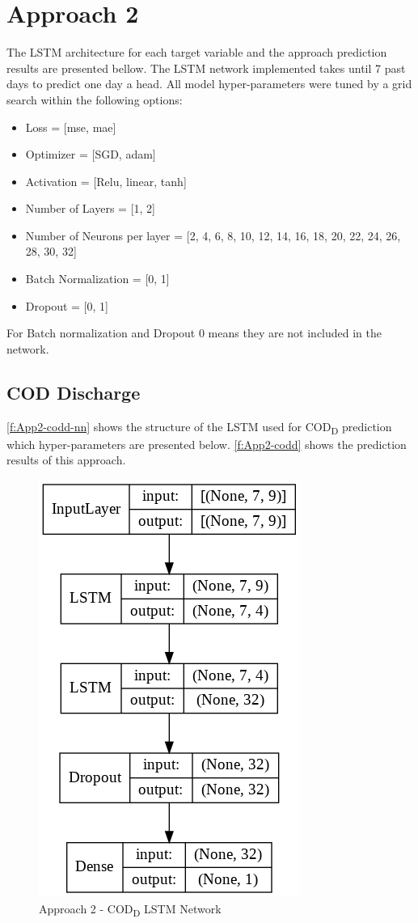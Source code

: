 \section{Approach 2}
The \ac{LSTM} architecture for each target variable and the approach prediction results are presented bellow. The \ac{LSTM} network implemented takes until 7 past days to predict one day a head.
All model hyper-parameters were tuned by a grid search within the following options:

\begin{itemize}
    \item Loss = [mse, mae]
    \item Optimizer = [SGD, adam]
    \item Activation = [Relu, linear, tanh]
    \item Number of Layers = [1, 2]
    \item Number of Neurons per layer = [2, 4, 6, 8, 10, 12, 14, 16, 18, 20, 22, 24, 26, 28, 30, 32]
    \item Batch Normalization = [0, 1]
    \item Dropout = [0, 1]
\end{itemize}

For Batch normalization and Dropout 0 means they are not included in the network.

\subsection{COD Discharge}
\autoref{f:App2-codd-nn} shows the structure of the \ac{LSTM} used for \ac{COD}\textsubscript{D} prediction which hyper-parameters are presented below. \autoref{f:App2-codd} shows the prediction results of this approach.

\begin{figure}[h]
\centering
 \includegraphics[width=0.4\linewidth]{figures/Ch5/App2_CODd.png}
\caption{Approach 2 - COD\textsubscript{D} LSTM Network}
\label{f:App2-codd-nn}
\end{figure}

